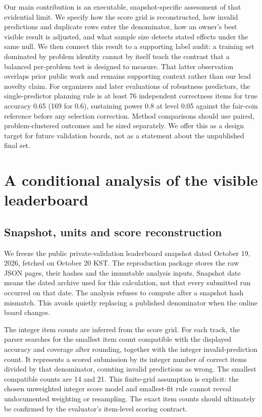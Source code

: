 Our main contribution is an executable, snapshot-specific assessment of that evidential limit. We specify how the score grid is reconstructed, how invalid predictions and duplicate rows enter the denominator, how an owner's best visible result is adjusted, and what sample size detects stated effects under the same null. We then connect this result to a supporting label audit: a training set dominated by problem identity cannot by itself teach the contrast that a balanced per-problem test is designed to measure. That latter observation overlaps prior public work and remains supporting context rather than our lead novelty claim. For organizers and later evaluations of robustness predictors, the single-predictor planning rule is at least 76 independent correctness items for true accuracy 0.65 (169 for 0.6), sustaining power 0.8 at level 0.05 against the fair-coin reference before any selection correction. Method comparisons should use paired, problem-clustered outcomes and be sized separately. We offer this as a design target for future validation boards, not as a statement about the unpublished final set.


\section{A conditional analysis of the visible leaderboard}

\subsection{Snapshot, units and score reconstruction}

We freeze the public private-validation leaderboard snapshot dated October 19, 2026, fetched on October 20 KST. The reproduction package stores the raw JSON pages, their hashes and the immutable analysis inputs. Snapshot date means the dated archive used for this calculation, not that every submitted run occurred on that date. The analysis refuses to compute after a snapshot hash mismatch. This avoids quietly replacing a published denominator when the online board changes. \citep{S10}


The integer item counts are inferred from the score grid. For each track, the parser searches for the smallest item count compatible with the displayed accuracy and coverage after rounding, together with the integer invalid-prediction count. It represents a scored submission by its integer number of correct items divided by that denominator, counting invalid predictions as wrong. The smallest compatible counts are 14 and 21. This finite-grid assumption is explicit: the chosen unweighted integer score model and smallest-fit rule cannot reveal undocumented weighting or resampling. The exact item counts should ultimately be confirmed by the evaluator's item-level scoring contract.


